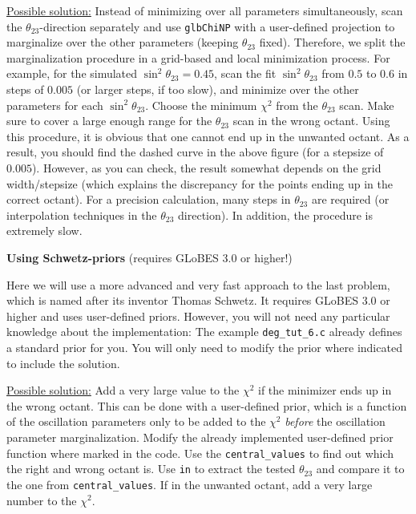 \documentclass[12pt,a4paper]{article}
\newcommand{\aufg}[1]{\vspace{4mm}{\bf\underline{Problem #1:}}\vspace{3mm}}
\begin{document}
\underline{Possible solution:}
Instead of minimizing over all parameters simultaneously, scan the $\theta_{23}$-direction separately and
use {\tt glbChiNP} with a user-defined projection to marginalize over the other parameters (keeping $\theta_{23}$ fixed). Therefore, we split the marginalization procedure in a grid-based and local minimization process. For example, for the simulated $\sin^2 \theta_{23} = 0.45$, scan the fit $\sin^2 \theta_{23}$ from $0.5$ to $0.6$ in steps of $0.005$ (or larger steps, if too slow), and minimize over the other parameters for each $\sin^2 \theta_{23}$. Choose the minimum $\chi^2$ from the $\theta_{23}$ scan. Make sure to cover a large enough range for the $\theta_{23}$ scan in the wrong octant. Using this procedure, it is obvious that one cannot end up in the unwanted octant. As a result, you should find the dashed curve in the above figure (for a stepsize of $0.005$). However, as you can check, the result somewhat depends on the grid width/stepsize (which explains the discrepancy for the points ending up in the correct octant). 
For a precision calculation, many steps in $\theta_{23}$ are required (or interpolation techniques in the $\theta_{23}$ direction). In addition, the procedure is extremely slow. 

\aufg{6} {\bf Using Schwetz-priors} (requires GLoBES 3.0 or higher!)

Here we will use a more advanced and very fast approach to the last problem, which is named
after its inventor Thomas Schwetz. It requires GLoBES 3.0 or higher and uses user-defined
priors. However, you will not need any particular knowledge about the implementation: The
example {\tt deg\_tut\_6.c} already defines a standard prior for you. You will only need
to modify the prior where indicated to include the solution.

\vspace*{3mm}

\underline{Possible solution:}
Add a very large value to the $\chi^2$ if the minimizer ends up in the wrong octant. This can be
done with a user-defined prior, which is a function of the oscillation parameters only to be added to the $\chi^2$ {\em before} the oscillation parameter marginalization.  Modify the already implemented user-defined prior function where marked in the code.  Use the {\tt central\_values} to find out
which the right and wrong octant is. Use {\tt in} to extract the tested $\theta_{23}$ and compare it
to the one from {\tt central\_values}. If in the unwanted octant, add a very large number to the $\chi^2$.
\end{document}
